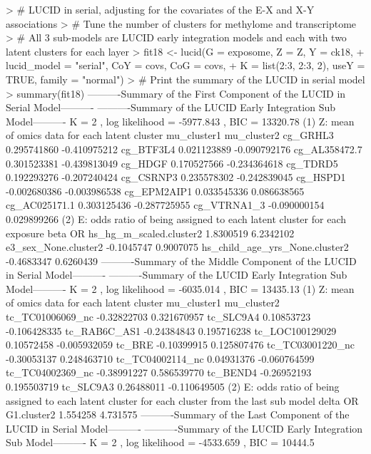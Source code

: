 \begin{example}
> # LUCID in serial, adjusting for the covariates of the E-X and X-Y associations
> # Tune the number of clusters for methylome and transcriptome
> # All 3 sub-models are LUCID early integration models and each with two latent clusters for each layer
> fit18 <- lucid(G = exposome, Z = Z, Y = ck18,
+                lucid_model = "serial", CoY = covs, CoG = covs,
+                K = list(2:3, 2:3, 2), useY = TRUE, family = "normal")
> # Print the summary of the LUCID in serial model
> summary(fit18)
----------Summary of the First Component of the LUCID in Serial Model----------
----------Summary of the LUCID Early Integration Sub Model----------
K =  2 , log likelihood = -5977.843 , BIC =  13320.78
(1) Z: mean of omics data for each latent cluster
               mu_cluster1  mu_cluster2
cg_GRHL3       0.295741860 -0.410975212
cg_BTF3L4      0.021123889 -0.090792176
cg_AL358472.7  0.301523381 -0.439813049
cg_HDGF        0.170527566 -0.234364618
cg_TDRD5       0.192293276 -0.207240424
cg_CSRNP3      0.235578302 -0.242839045
cg_HSPD1      -0.002680386 -0.003986538
cg_EPM2AIP1    0.033545336  0.086638565
cg_AC025171.1  0.303125436 -0.287725955
cg_VTRNA1_3   -0.090000154  0.029899266
(2) E: odds ratio of being assigned to each latent cluster for each exposure
                                     beta        OR
hs_hg_m_scaled.cluster2         1.8300519 6.2342102
e3_sex_None.cluster2           -0.1045747 0.9007075
hs_child_age_yrs_None.cluster2 -0.4683347 0.6260439
----------Summary of the Middle Component of the LUCID in Serial Model----------
----------Summary of the LUCID Early Integration Sub Model----------
K =  2 , log likelihood = -6035.014 , BIC =  13435.13
(1) Z: mean of omics data for each latent cluster
                 mu_cluster1  mu_cluster2
tc_TC01006069_nc -0.32822703  0.321670957
tc_SLC9A4         0.10853723 -0.106428335
tc_RAB6C_AS1     -0.24384843  0.195716238
tc_LOC100129029   0.10572458 -0.005932059
tc_BRE           -0.10399915  0.125807476
tc_TC03001220_nc -0.30053137  0.248463710
tc_TC04002114_nc  0.04931376 -0.060764599
tc_TC04002369_nc -0.38991227  0.586539770
tc_BEND4         -0.26952193  0.195503719
tc_SLC9A3         0.26488011 -0.110649505
(2) E: odds ratio of being assigned to each latent cluster for each cluster
    from the last sub model
               delta       OR
G1.cluster2 1.554258 4.731575
----------Summary of the Last Component of the LUCID in Serial Model----------
----------Summary of the LUCID Early Integration Sub Model----------
K =  2 , log likelihood = -4533.659 , BIC =  10444.5

\end{example}
